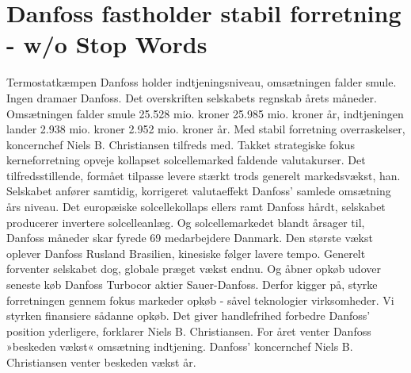 \section{Danfoss fastholder stabil forretning - w/o Stop Words}
\label{Lemvig1:textFiltered}
Termostatkæmpen Danfoss holder indtjeningsniveau, omsætningen falder smule. 	Ingen dramaer Danfoss. 	Det overskriften selskabets regnskab årets måneder. Omsætningen falder smule 25.528 mio. kroner 25.985 mio. kroner år, indtjeningen lander 2.938 mio. kroner 2.952 mio. kroner år. 	Med stabil forretning overraskelser, koncernchef Niels B. Christiansen tilfreds med. 	Takket strategiske fokus kerneforretning opveje kollapset solcellemarked faldende valutakurser. Det tilfredsstillende, formået tilpasse levere stærkt trods generelt markedsvækst, han. 	Selskabet anfører samtidig, korrigeret valutaeffekt Danfoss' samlede omsætning års niveau. 	Det europæiske solcellekollaps ellers ramt Danfoss hårdt, selskabet producerer invertere solcelleanlæg. Og solcellemarkedet blandt årsager til, Danfoss måneder skar fyrede 69 medarbejdere Danmark. 	Den største vækst oplever Danfoss Rusland Brasilien, kinesiske følger lavere tempo. Generelt forventer selskabet dog, globale præget vækst endnu. Og åbner opkøb udover seneste køb Danfoss Turbocor aktier Sauer-Danfoss. 	Derfor kigger på, styrke forretningen gennem fokus markeder opkøb - såvel teknologier virksomheder. Vi styrken finansiere sådanne opkøb. Det giver handlefrihed forbedre Danfoss' position yderligere, forklarer Niels B. Christiansen. 	For året venter Danfoss »beskeden vækst« omsætning indtjening. 	Danfoss' koncernchef Niels B. Christiansen venter beskeden vækst år. 